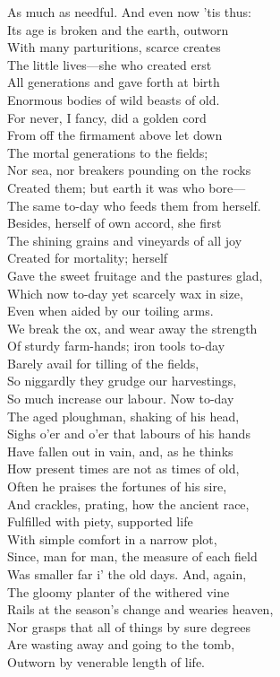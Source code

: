As much as needful. And even now 'tis thus:\\
Its age is broken and the earth, outworn\\
With many parturitions, scarce creates\\
The little lives—she who created erst\\
All generations and gave forth at birth\\
Enormous bodies of wild beasts of old.\\
For never, I fancy, did a golden cord\\
From off the firmament above let down\\
The mortal generations to the fields;\\
Nor sea, nor breakers pounding on the rocks\\
Created them; but earth it was who bore—\\
The same to-day who feeds them from herself.\\
Besides, herself of own accord, she first\\
The shining grains and vineyards of all joy\\
Created for mortality; herself\\
Gave the sweet fruitage and the pastures glad,\\
Which now to-day yet scarcely wax in size,\\
Even when aided by our toiling arms.\\
We break the ox, and wear away the strength\\
Of sturdy farm-hands; iron tools to-day\\
Barely avail for tilling of the fields,\\
So niggardly they grudge our harvestings,\\
So much increase our labour. Now to-day\\
The aged ploughman, shaking of his head,\\
Sighs o'er and o'er that labours of his hands\\
Have fallen out in vain, and, as he thinks\\
How present times are not as times of old,\\
Often he praises the fortunes of his sire,\\
And crackles, prating, how the ancient race,\\
Fulfilled with piety, supported life\\
With simple comfort in a narrow plot,\\
Since, man for man, the measure of each field\\
Was smaller far i' the old days. And, again,\\
The gloomy planter of the withered vine\\
Rails at the season's change and wearies heaven,\\
Nor grasps that all of things by sure degrees\\
Are wasting away and going to the tomb,\\
Outworn by venerable length of life.

